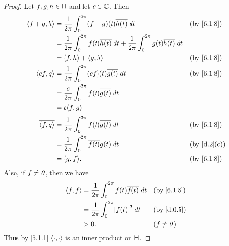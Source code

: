 \begin{proof}
  Let \(f, g, h \in \mathsf{H}\) and let \(c \in \mathbb{C}\).
  Then
  \begin{align*}
    \inn{f + g, h}    & = \frac{1}{2 \pi} \int_0^{2 \pi} (f + g)(t) \conj{h(t)} \; dt                                                   &  & \by{6.1.8}  \\
                      & = \frac{1}{2 \pi} \int_0^{2 \pi} f(t) \conj{h(t)} \; dt + \frac{1}{2 \pi} \int_0^{2 \pi} g(t) \conj{h(t)} \; dt                  \\
                      & = \inn{f, h} + \inn{g, h}                                                                                       &  & \by{6.1.8}  \\
    \inn{cf, g}       & = \frac{1}{2 \pi} \int_0^{2 \pi} (cf)(t) \conj{g(t)} \; dt                                                      &  & \by{6.1.8}  \\
                      & = \frac{c}{2 \pi} \int_0^{2 \pi} f(t) \conj{g(t)} \; dt                                                                          \\
                      & = c \inn{f, g}                                                                                                                   \\
    \conj{\inn{f, g}} & = \conj{\frac{1}{2 \pi} \int_0^{2 \pi} f(t) \conj{g(t)} \; dt}                                                  &  & \by{6.1.8}  \\
                      & = \frac{1}{2 \pi} \int_0^{2 \pi} \conj{f(t)} g(t) \; dt                                                         &  & \by{d.2}[c] \\
                      & = \inn{g, f}.                                                                                                   &  & \by{6.1.8}
  \end{align*}
  Also, if \(f \neq \mathit{0}\), then we have
  \begin{align*}
    \inn{f, f} & = \frac{1}{2 \pi} \int_0^{2 \pi} f(t) \conj{f(t)} \; dt &  & \by{6.1.8}   \\
               & = \frac{1}{2 \pi} \int_0^{2 \pi} \abs{f(t)}^2 \; dt     &  & \by{d.0.5}   \\
               & > 0.                                                    &  & (f \neq \zv)
  \end{align*}
  Thus by \cref{6.1.1} \(\left\langle\cdot, \cdot\right\rangle\) is an inner product on \(\mathsf{H}\).
\end{proof}

